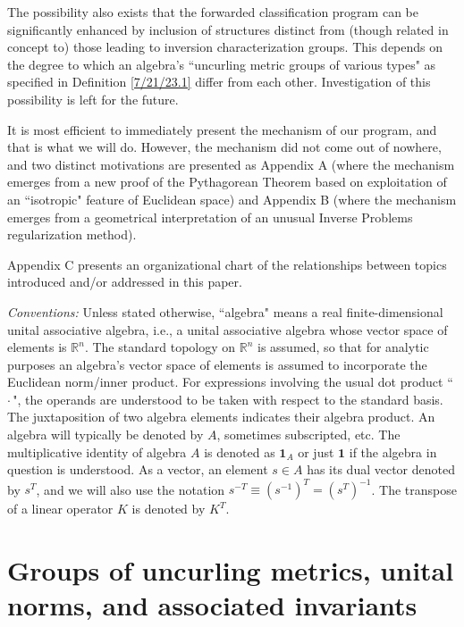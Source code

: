 \documentclass{amsart}
\numberwithin{equation}{section}
\theoremstyle{definition}
\numberwithin{theorem}{section}
\begin{document}
The possibility also exists that the forwarded classification program can be significantly enhanced by inclusion of structures distinct from (though related in concept to) those leading to inversion characterization groups.  This depends on the degree to which an algebra's ``uncurling metric groups of various types" as specified in Definition \ref{7/21/23.1} differ from each other.  Investigation of this possibility is left for the future.
  
         It is most efficient to immediately present the mechanism of our program, and that is what we will do.  However, the mechanism did not come out of nowhere, and two distinct motivations are presented as Appendix A (where the mechanism emerges from a new proof of the Pythagorean Theorem based on exploitation of an ``isotropic" feature of Euclidean space) and Appendix B (where the mechanism emerges from a geometrical interpretation of an unusual Inverse Problems regularization method).
         
   Appendix C presents an organizational chart of the relationships between topics introduced and/or addressed in this paper.     

\bigskip
 
 {\it Conventions:}   Unless stated otherwise, ``algebra" means a real finite-dimensional unital associative algebra, i.e., a unital associative algebra whose vector space of elements is $\mathbb{R}^n$. The standard topology on $\mathbb{R}^n$ is assumed, so that for analytic purposes an algebra's vector space of elements is assumed to incorporate the Euclidean norm/inner product.  For expressions involving the usual dot product ``\,$\cdot$\,", the operands are understood to be taken with respect to the standard basis. The juxtaposition of two algebra elements indicates their algebra product.   An algebra will typically be denoted by $A$, sometimes subscripted, etc. The multiplicative identity of algebra $A$ is denoted as $\mathbf{1}_A$ or just $\mathbf{1}$ if the algebra in question is understood.   As a vector, an element $s\in A$ has its dual vector denoted by $s^T$, and we will also use the notation $s^{-T} \equiv (s^{-1})^T = (s^T)^{-1}$.  The transpose of a linear operator $K$ is denoted by $K^T$.                
       
       \bigskip
       


    
 
 \section{Groups of uncurling metrics, unital norms, and associated  invariants}
 
\end{document}
